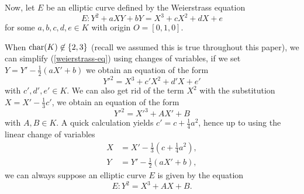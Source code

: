 
Now, let $E$ be an elliptic curve defined by the Weierstrass equation
\begin{equation}
	\label{weierstrass-eq}
	E: Y^2 + aXY + bY = X^3 + cX^2 + dX + e
\end{equation}
for some $a, b, c, d, e \in K$ with origin $O = [0, 1, 0]$.

When $\operatorname{char}(K) \not\in \{2, 3\}$ (recall we assumed this is true throughout this
paper), we can simplify (\ref{weierstrass-eq}) using changes of variables,
if we set $Y = Y' - \frac{1}{2}(aX'  + b)$ we obtain an equation of the form
\begin{equation*}
	Y'^2 = X^3 + c'X^2 + d'X + e'
\end{equation*}
with $c', d', e' \in K$. We can also get rid of the term $X^2$ with the
substitution $X = X' - \frac{1}{3}c'$, we obtain an equation of the form
\begin{equation*}
	Y'^2 = X'^3 + AX' + B
\end{equation*}
with $A, B \in K$. A quick calculation yields $c' = c + \frac{1}{4}a^2$,
hence up to using the linear change of variables
\begin{align*}
	X &= X' - \frac{1}{3}\left(c  + \frac{1}{4}a^2\right),\\
	Y &= Y' - \frac{1}{2}(aX'  + b),
\end{align*}
we can always suppose an elliptic curve $E$ is given by the equation
\begin{equation*}
	E: Y^2 = X^3 + AX + B.
\end{equation*}


